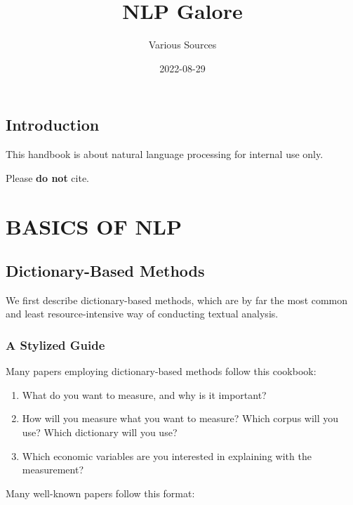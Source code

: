 \documentclass[
]{book}
\title{NLP Galore}
\author{Various Sources}
\date{2022-08-29}
\providecommand{\tightlist}{%
  \setlength{\itemsep}{0pt}\setlength{\parskip}{0pt}}
\begin{document}
\maketitle

{
\setcounter{tocdepth}{1}
\tableofcontents
}
\hypertarget{introduction}{%
\chapter{Introduction}\label{introduction}}

This handbook is about natural language processing for internal use only.

Please \textbf{do not} cite.

\hypertarget{part-basics-of-nlp}{%
\part*{BASICS OF NLP}\label{part-basics-of-nlp}}

\hypertarget{dictionary-based-methods}{%
\chapter{Dictionary-Based Methods}\label{dictionary-based-methods}}

We first describe dictionary-based methods, which are by far the most common and least resource-intensive way of conducting textual analysis.

\hypertarget{a-stylized-guide}{%
\section{A Stylized Guide}\label{a-stylized-guide}}

Many papers employing dictionary-based methods follow this cookbook:

\begin{enumerate}
\def\labelenumi{\arabic{enumi}.}
\tightlist
\item
  What do you want to measure, and why is it important?
\item
  How will you measure what you want to measure? Which corpus will you use? Which dictionary will you use?
\item
  Which economic variables are you interested in explaining with the measurement?
\end{enumerate}

Many well-known papers follow this format:
\end{document}

